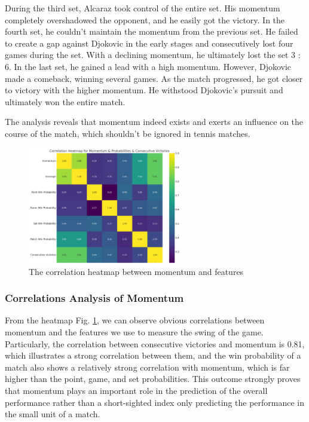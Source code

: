 \documentclass{mcmthesis}
\begin{document}
During the third set, Alcaraz took control of the entire set. His momentum completely overshadowed the opponent, and he easily got the victory. In the fourth set, he couldn't maintain the momentum from the previous set. He failed to create a gap against Djokovic in the early stages and consecutively lost four games during the set. With a declining momentum, he ultimately lost the set 3 $:$ 6. In the last set, he gained a lead with a high momentum. However, Djokovic made a comeback, winning several games. As the match progressed, he got closer to victory with the higher momentum. He withstood Djokovic's pursuit and ultimately won the entire match.

The analysis reveals that momentum indeed exists and exerts an influence on the course of the match, which shouldn't be ignored in tennis matches. 

\begin{figure}[ht]
    \centering
    \begin{minipage}{\textwidth}
        \centering
        \includegraphics[width=0.6\textwidth]{figures/correlation.png} 
        \caption{The correlation heatmap between momentum and features}
        \label{fig:correlation}
    \end{minipage}\hfill
\end{figure}

\subsubsection{Correlations Analysis of Momentum}   

From the heatmap Fig. \ref{fig:correlation}, we can observe obvious correlations between momentum and the features we use to measure the swing of the game. Particularly, the correlation between consecutive victories and momentum is 0.81, which illustrates a strong correlation between them, and the win probability of a match also shows a relatively strong correlation with momentum, which is far higher than the point, game, and set probabilities. This outcome strongly proves that momentum plays an important role in the prediction of the overall performance rather than a short-sighted index only predicting the performance in the small unit of a match.
\end{document}

